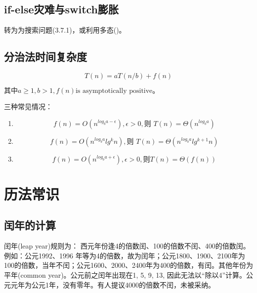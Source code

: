 \subsection{if-else灾难与switch膨胀}
转为为搜索问题(\cite{pp}3.7.1)，或利用多态(\cite{refractor})。

\subsection{分治法时间复杂度}
\begin{displaymath}
    T(n)=aT(n/b)+f(n)
\end{displaymath}

\begin{math}
    \textrm{其中} a \ge 1, b > 1, f(n) \textrm{is asymptotically positive}。
\end{math}

三种常见情况：
\begin{enumerate}
    \item 
\begin{displaymath}
    f(n)=O(n^{log_{b}a-\epsilon}), \epsilon>0, \textrm{则 }T(n)=\Theta(n^{log_{b}a})
\end{displaymath}

    \item 
\begin{displaymath}
    f(n)=O(n^{log_{b}a}lg^{k}n), \textrm{则 }T(n)=\Theta(n^{log_{b}a}lg^{k+1}n)
\end{displaymath}

    \item 
\begin{displaymath}
    f(n)=O(n^{log_{b}a+\epsilon}), \epsilon>0, \textrm{则}T(n)=\Theta(f(n))
\end{displaymath}

\end{enumerate}

\label{divide_complex}


\section{历法常识}
\subsection{闰年的计算}
\label{subsec:leapyear}
闰年(leap year)规则为： 西元年份逢4的倍数闰、100的倍数不闰、400的倍数闰。例如：公元1992、1996 年等为4的倍数，故为闰年；公元1800、1900、2100年为100的倍数，当年不闰；公元1600、2000、2400年为400的倍数，有闰。其他年份为平年(common year)。公元前之闰年出现在1, 5, 9, 13, 因此无法以“除以4”计算。公元元年为公元1年，没有零年。有人提议4000的倍数不闰，未被采纳。


